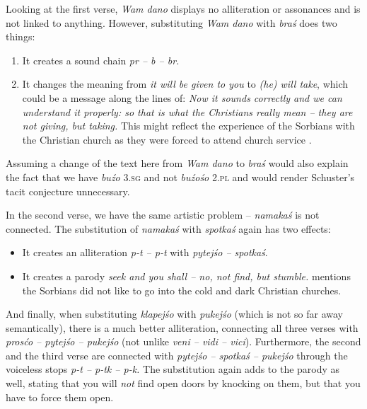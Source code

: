 \documentclass[output=paper,hidelinks]{langscibook}
\begin{document}
 
Looking at the first verse, \textit{Wam dano} displays no alliteration or assonances and is not linked to anything. However, substituting \textit{Wam dano} with \textit{braś} does two things:
 

\begin{enumerate}
\item It creates a sound chain \textit{pr – b – br.}
\item It changes the meaning from \textit{it will be given to you} to \textit{(he) will take}, which could be a message along the lines of: \textit{Now it sounds correctly and we can understand it properly: so that is what the Christians really mean – they are not giving, but taking.} This might reflect the experience of the Sorbians with the Christian church as they were forced to attend church service \citep[150]{Knauthe1767}.
\end{enumerate}
 
Assuming a change of the text here from \textit{Wam dano} to \textit{braś} would also explain the fact that we have \textit{buźo} \textsc{3.sg} and not \textit{buźośo} \textsc{2.pl} and would render Schuster’s tacit conjecture unnecessary.
 

 
In the second verse, we have the same artistic problem – \textit{namakaś} is not connected. The substitution of \textit{namakaś} with \textit{spotkaś} again has two effects:
 

\begin{itemize}
\item It creates an alliteration \textit{p-t – p-t} with \textit{pytejśo – spotkaś}.
\item It creates a parody \textit{seek and you shall – no, not find, but stumble.} \citet[120ff]{Knauthe1767} mentions the Sorbians did not like to go into the cold and dark Christian churches.
\end{itemize}
 
And finally, when substituting \textit{klapejśo} with \textit{pukejśo} (which is not so far away semantically), there is a much better alliteration, connecting all three verses with \textit{prosćo – pytejśo – pukejśo} (not unlike \textit{veni – vidi – vici}). Furthermore, the second and the third verse are connected with \textit{pytejśo – spotkaś – pukejśo} through the voiceless stops \textit{p-t – p-tk – p-k.} The substitution again adds to the parody as well, stating that you will \textit{not} find open doors by knocking on them, but that you have to force them open.
 
\end{document}
